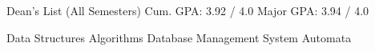 Dean's List (All Semesters) \textbullet{}
Cum. GPA: 3.92 / 4.0 \textbullet{}
Major GPA: 3.94 / 4.0


Data Structures \textbullet{} Algorithms \textbullet{} Database Management System \textbullet{} Automata